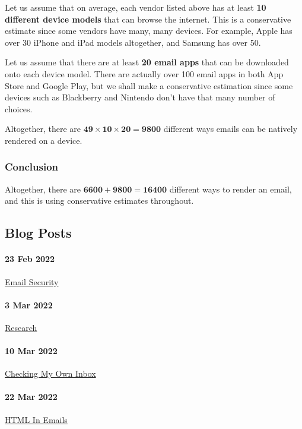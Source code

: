 \documentclass{article}
\begin{document}
Let us assume that on average, each vendor listed above has at least \textbf{10 different device models} that can browse the internet. This is a conservative estimate since some vendors have many, many devices. For example, Apple has over 30 iPhone and iPad models altogether, and Samsung has over 50.

Let us assume that there are at least \textbf{20 email apps} that can be downloaded onto each device model. There are actually over 100 email apps in both App Store and Google Play, but we shall make a conservative estimation since some devices such as Blackberry and Nintendo don't have that many number of choices.

Altogether, there are $\mathbf{49 \times 10 \times 20 = 9800}$ different ways emails can be natively rendered on a device.

\subsubsection{Conclusion}

Altogether, there are $\mathbf{6600 + 9800 = 16400}$ different ways to render an email, and this is using conservative estimates throughout.

\subsection{\label{blogs}Blog Posts}

\paragraph{23 Feb 2022} \href{https://www.openlearning.com/u/hayeschoy-r7a9ti/blog/SomethingAwesomeEmailSecurity/}{Email Security}
\paragraph{3 Mar 2022} \href{https://www.openlearning.com/u/hayeschoy-r7a9ti/blog/SomethingAwesomeResearch3March/}{Research}
\paragraph{10 Mar 2022} \href{https://www.openlearning.com/u/hayeschoy-r7a9ti/blog/SomethingAwesomeCheckingMyOwnInbox10March/}{Checking My Own Inbox}
\paragraph{22 Mar 2022} \href{https://www.openlearning.com/u/hayeschoy-r7a9ti/blog/SomethingAwesomeHtmlInEmails22March/}{HTML In Emails}
\end{document}
